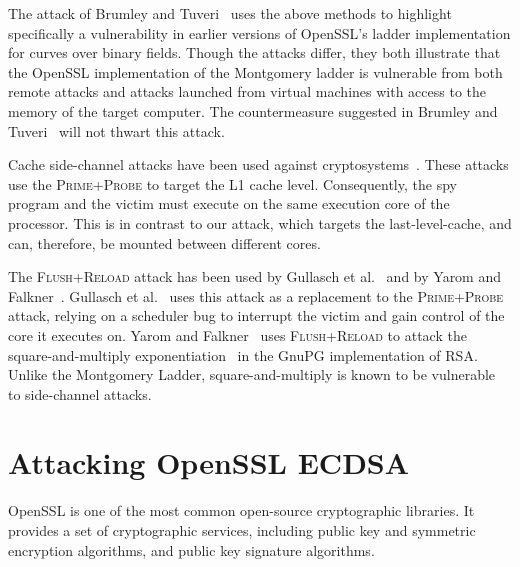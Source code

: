 \documentclass[twocolumn]{svjour3}
\begin{document}
The attack of Brumley and Tuveri~\cite{brumley11remote} uses the above methods to highlight specifically a vulnerability in earlier versions of OpenSSL's ladder implementation for curves over binary fields. %
Though the attacks differ, they both illustrate that the OpenSSL implementation of the Montgomery ladder is vulnerable from both remote attacks and attacks launched from virtual machines with access to the memory of the target computer. 
The countermeasure suggested in Brumley and Tuveri~\cite{brumley11remote} will not thwart this attack.

Cache side-channel attacks have been used against cryptosystems~\cite{aciicmez07yet,aciicmez10new,aciicmez08vulnerability,chen13improvement,canteaut06understanding,tromer10efficient,zhang12cross}.
These attacks use the \textsc{Prime+Probe} to target the L1 cache level.
Consequently, the spy program and the victim must execute on the same execution core of the processor.
This is in contrast to our attack, which targets the last-level-cache, and can, therefore, be mounted between different cores.

The \textsc{Flush+Reload} attack has been used by Gullasch et al.~\cite{gullasch11cache} and by Yarom and Falkner~\cite{yarom13flush}.
Gullasch et al.~\cite{gullasch11cache} uses this attack as a replacement to the \textsc{Prime+Probe} attack,
relying on a scheduler bug to interrupt the victim and gain control of the core it executes on.
Yarom and Falkner~\cite{yarom13flush} uses \textsc{Flush+Reload} to attack the square-and-multiply exponentiation~\cite{gordon98survey} 
in the GnuPG implementation of RSA.
Unlike the Montgomery Ladder, square-and-multiply is known to be vulnerable to side-channel attacks.


\section{Attacking OpenSSL ECDSA}\label{sec:attack}
OpenSSL is one of the most common open-source cryptographic libraries.
It provides a set of cryptographic services, including public key and symmetric encryption 
algorithms, and public key signature algorithms.
\end{document}
